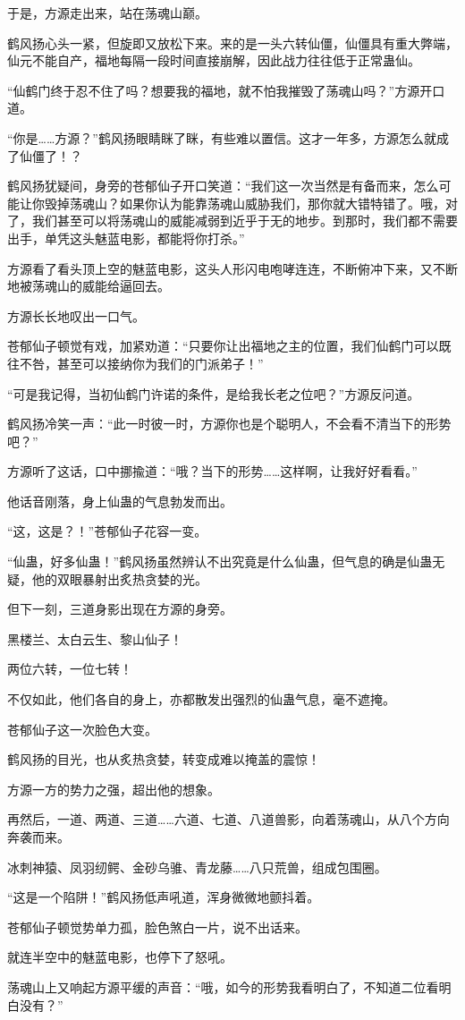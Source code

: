 \begin{this_body}
于是，方源走出来，站在荡魂山巅。

鹤风扬心头一紧，但旋即又放松下来。来的是一头六转仙僵，仙僵具有重大弊端，仙元不能自产，福地每隔一段时间直接崩解，因此战力往往低于正常蛊仙。

“仙鹤门终于忍不住了吗？想要我的福地，就不怕我摧毁了荡魂山吗？”方源开口道。

“你是……方源？”鹤风扬眼睛眯了眯，有些难以置信。这才一年多，方源怎么就成了仙僵了！？

鹤风扬犹疑间，身旁的苍郁仙子开口笑道：“我们这一次当然是有备而来，怎么可能让你毁掉荡魂山？如果你认为能靠荡魂山威胁我们，那你就大错特错了。哦，对了，我们甚至可以将荡魂山的威能减弱到近乎于无的地步。到那时，我们都不需要出手，单凭这头魅蓝电影，都能将你打杀。”

方源看了看头顶上空的魅蓝电影，这头人形闪电咆哮连连，不断俯冲下来，又不断地被荡魂山的威能给逼回去。

方源长长地叹出一口气。

苍郁仙子顿觉有戏，加紧劝道：“只要你让出福地之主的位置，我们仙鹤门可以既往不咎，甚至可以接纳你为我们的门派弟子！”

“可是我记得，当初仙鹤门许诺的条件，是给我长老之位吧？”方源反问道。

鹤风扬冷笑一声：“此一时彼一时，方源你也是个聪明人，不会看不清当下的形势吧？”

方源听了这话，口中挪揄道：“哦？当下的形势……这样啊，让我好好看看。”

他话音刚落，身上仙蛊的气息勃发而出。

“这，这是？！”苍郁仙子花容一变。

“仙蛊，好多仙蛊！”鹤风扬虽然辨认不出究竟是什么仙蛊，但气息的确是仙蛊无疑，他的双眼暴射出炙热贪婪的光。

但下一刻，三道身影出现在方源的身旁。

黑楼兰、太白云生、黎山仙子！

两位六转，一位七转！

不仅如此，他们各自的身上，亦都散发出强烈的仙蛊气息，毫不遮掩。

苍郁仙子这一次脸色大变。

鹤风扬的目光，也从炙热贪婪，转变成难以掩盖的震惊！

方源一方的势力之强，超出他的想象。

再然后，一道、两道、三道……六道、七道、八道兽影，向着荡魂山，从八个方向奔袭而来。

冰刺神猿、凤羽纫鳄、金砂乌骓、青龙藤……八只荒兽，组成包围圈。

“这是一个陷阱！”鹤风扬低声吼道，浑身微微地颤抖着。

苍郁仙子顿觉势单力孤，脸色煞白一片，说不出话来。

就连半空中的魅蓝电影，也停下了怒吼。

荡魂山上又响起方源平缓的声音：“哦，如今的形势我看明白了，不知道二位看明白没有？”

\end{this_body}

